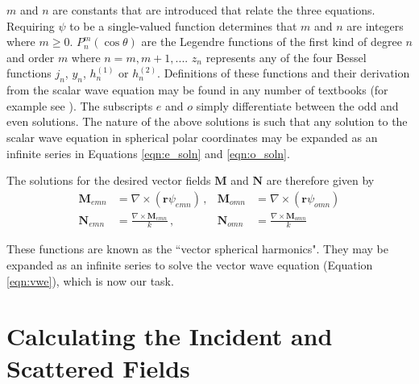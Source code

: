 {\noindent $m$ and $n$ are constants that are introduced that relate the three equations.  Requiring $\psi$ to be a single-valued function determines that $m$ and $n$ are integers where $m\geqslant0$.   $P_n^m(\cos\theta)$ are the Legendre functions of the first kind of degree $n$ and order $m$ where $n=m,m+1,...$.  $z_n$ represents any of the four Bessel functions $j_n$, $y_n$, $h_n^{(1)}$ or $h_n^{(2)}$.  Definitions of these functions and their derivation from the scalar wave equation may be found in any number of textbooks (for example see \citet{Riley2006}).  The subscripts $e$ and $o$ simply differentiate between the odd and even solutions.  The nature of the above solutions is such that any solution to the scalar wave equation in spherical polar coordinates may be expanded as an infinite series in Equations \ref{eqn:e_soln} and \ref{eqn:o_soln}. 

The solutions for the desired vector fields $\mathbf{M}$ and $\mathbf{N}$ are therefore given by 
\begin{align}
\label{eqn:vsh1}
\mathbf{M}_{emn}&=\nabla \times (\mathbf{r}\psi_{emn}) \, ,   &\mathbf{M}_{omn}&=\nabla \times (\mathbf{r}\psi_{omn}) \\
\label{eqn:vsh2}
\mathbf{N}_{emn}&=\frac{\nabla \times \mathbf{M}_{emn}}{k} \, ,   &\mathbf{N}_{omn}&=\frac{\nabla \times \mathbf{M}_{omn}}{k}
\end{align}

\noindent These functions are known as the ``vector spherical harmonics".  They may be expanded as an infinite series to solve the vector wave equation (Equation \ref{eqn:vwe}), which is now our task.

\section{Calculating the Incident and Scattered Fields}

}
